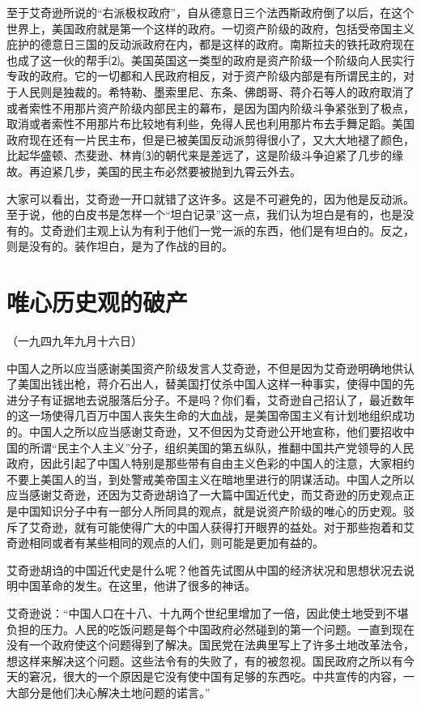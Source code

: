 \documentclass[UTF-8, a5paper, 12pt]{ctexart}
\begin{document}
至于艾奇逊所说的“右派极权政府”，自从德意日三个法西斯政府倒了以后，在这个世界上，美国政府就是第一个这样的政府。一切资产阶级的政府，包括受帝国主义庇护的德意日三国的反动派政府在内，都是这样的政府。南斯拉夫的铁托政府现在也成了这一伙的帮手⑵。美国英国这一类型的政府是资产阶级一个阶级向人民实行专政的政府。它的一切都和人民政府相反，对于资产阶级内部是有所谓民主的，对于人民则是独裁的。希特勒、墨索里尼、东条、佛朗哥、蒋介石等人的政府取消了或者索性不用那片资产阶级内部民主的幕布，是因为国内阶级斗争紧张到了极点，取消或者索性不用那片布比较地有利些，免得人民也利用那片布去手舞足蹈。美国政府现在还有一片民主布，但是已被美国反动派剪得很小了，又大大地褪了颜色，比起华盛顿、杰斐逊、林肯⑶的朝代来是差远了，这是阶级斗争迫紧了几步的缘故。再迫紧几步，美国的民主布必然要被抛到九霄云外去。

大家可以看出，艾奇逊一开口就错了这许多。这是不可避免的，因为他是反动派。至于说，他的白皮书是怎样一个“坦白记录”这一点，我们认为坦白是有的，也是没有的。艾奇逊们主观上认为有利于他们一党一派的东西，他们是有坦白的。反之，则是没有的。装作坦白，是为了作战的目的。

\section{唯心历史观的破产}

（一九四九年九月十六日）

中国人之所以应当感谢美国资产阶级发言人艾奇逊，不但是因为艾奇逊明确地供认了美国出钱出枪，蒋介石出人，替美国打仗杀中国人这样一种事实，使得中国的先进分子有证据地去说服落后分子。不是吗？你们看，艾奇逊自己招认了，最近数年的这一场使得几百万中国人丧失生命的大血战，是美国帝国主义有计划地组织成功的。中国人之所以应当感谢艾奇逊，又不但因为艾奇逊公开地宣称，他们要招收中国的所谓“民主个人主义”分子，组织美国的第五纵队，推翻中国共产党领导的人民政府，因此引起了中国人特别是那些带有自由主义色彩的中国人的注意，大家相约不要上美国人的当，到处警戒美帝国主义在暗地里进行的阴谋活动。中国人之所以应当感谢艾奇逊，还因为艾奇逊胡诌了一大篇中国近代史，而艾奇逊的历史观点正是中国知识分子中有一部分人所同具的观点，就是说资产阶级的唯心的历史观。驳斥了艾奇逊，就有可能使得广大的中国人获得打开眼界的益处。对于那些抱着和艾奇逊相同或者有某些相同的观点的人们，则可能是更加有益的。

艾奇逊胡诌的中国近代史是什么呢？他首先试图从中国的经济状况和思想状况去说明中国革命的发生。在这里，他讲了很多的神话。

艾奇逊说：“中国人口在十八、十九两个世纪里增加了一倍，因此使土地受到不堪负担的压力。人民的吃饭问题是每个中国政府必然碰到的第一个问题。一直到现在没有一个政府使这个问题得到了解决。国民党在法典里写上了许多土地改革法令，想这样来解决这个问题。这些法令有的失败了，有的被忽视。国民政府之所以有今天的窘况，很大的一个原因是它没有使中国有足够的东西吃。中共宣传的内容，一大部分是他们决心解决土地问题的诺言。”
\end{document}
